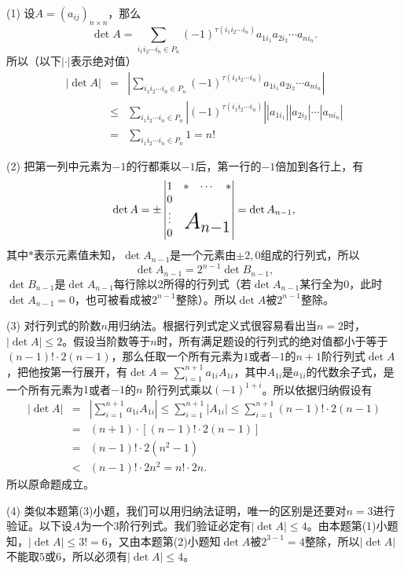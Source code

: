 \documentclass[a4paper]{book}
\newcommand{\enum}{\begin{list}{}{\setlength{\leftmargin}{0pt} \setlength{\itemindent}{2.5em} \setlength{\listparindent}{2em}}}
\begin{document}
\enum
\item[(1)] 设$A = (a_{ij})_{n\times n}$，那么
$$\det A = \sum\limits_{i_1i_2\cdots i_n\in P_n} (-1)^{\tau(i_1i_2\cdots i_n)}a_{1i_1}a_{2i_2}\cdots a_{ni_n}.$$
所以（以下$|\cdot|$表示绝对值）
\begin{eqnarray*}
|\det A| & = & |\sum\limits_{i_1i_2\cdots i_n\in P_n} (-1)^{\tau(i_1i_2\cdots i_n)}a_{1i_1}a_{2i_2}\cdots a_{ni_n}| \\
& \leqslant & \sum\limits_{i_1i_2\cdots i_n\in P_n} |(-1)^{\tau(i_1i_2\cdots i_n)}||a_{1i_1}||a_{2i_2}|\cdots |a_{ni_n}| \\
& = & \sum\limits_{i_1i_2\cdots i_n\in P_n}1 = n!
\end{eqnarray*}
\item[(2)] 把第一列中元素为$-1$的行都乘以$-1$后，第一行的$-1$倍加到各行上，有
$$\det A = \pm \begin{vmatrix} 1 & \ast & \cdots & \ast \\ 0 & & & \\ \vdots & & \makebox(0,0){\huge $A_{n-1}$} & \\ 0 & & & \end{vmatrix} = \det A_{n-1},$$
其中$\ast$表示元素值未知，$\det A_{n-1}$是一个元素由$\pm2,0$组成的行列式，所以
$$\det A_{n-1} = 2^{n-1}\det B_{n-1},$$
$\det B_{n-1}$是$\det A_{n-1}$每行除以2所得的行列式（若$\det A_{n-1}$某行全为$0$，此时$\det A_{n-1} = 0$，也可被看成被$2^{n-1}$整除）。所以$\det A$被$2^{n-1}$整除。
\item[(3)] 对行列式的阶数$n$用归纳法。根据行列式定义式很容易看出当$n=2$时，$|\det A| \leqslant 2$。假设当阶数等于$n$时，所有满足题设的行列式的绝对值都小于等于$(n-1)!\cdot2(n-1)$，那么任取一个所有元素为$1$或者$-1$的$n+1$阶行列式$\det A$，把他按第一行展开，有$\det A = \sum\limits_{i=1}^{n+1} a_{1i}A_{1i}$，其中$A_{1i}$是$a_{1i}$的代数余子式，是一个所有元素为$1$或者$-1$的$n$ 阶行列式乘以$(-1)^{1+i}$。所以依据归纳假设有
\begin{eqnarray*}
|\det A| & = & \left|\sum\limits_{i=1}^{n+1} a_{1i}A_{1i}\right| \leqslant \sum\limits_{i=1}^{n+1} \left|A_{1i}\right| \leqslant \sum\limits_{i=1}^{n+1} (n-1)! \cdot 2(n-1) \\
& = & (n+1)\cdot\left[(n-1)! \cdot 2(n-1)\right] \\
& = & (n-1)! \cdot 2(n^2-1) \\
& < & (n-1)! \cdot 2n^2 = n!\cdot 2n.
\end{eqnarray*}
所以原命题成立。
\item[(4)] 类似本题第(3)小题，我们可以用归纳法证明，唯一的区别是还要对$n = 3$进行验证。以下设$A$为一个$3$阶行列式。我们验证必定有$|\det A| \leqslant 4$。由本题第(1)小题知，$|\det A| \leqslant 3! = 6$，又由本题第(2)小题知$\det A$被$2^{3-1} = 4$整除，所以$|\det A|$不能取$5$或$6$，所以必须有$|\det A| \leqslant 4$。
\end{list}
\end{document}
